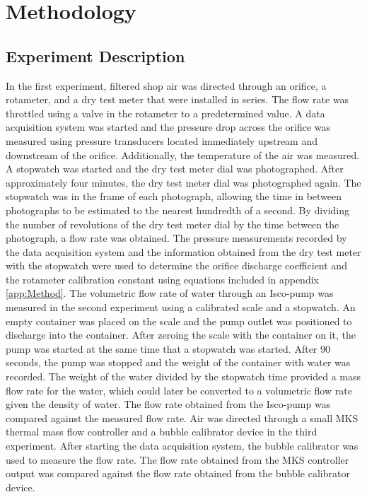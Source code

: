 \documentclass[paper=letter, fontsize=10pt]{scrartcl} %
\begin{document}
\section{Methodology}
\subsection{Experiment Description}
In the first experiment, filtered shop air was directed through an orifice, a rotameter, and a dry test meter that were installed in series.  The flow rate was throttled using a valve in the rotameter to a predetermined value.  A data acquisition system was started and the pressure drop across the orifice was measured using pressure transducers located immediately upstream and downstream of the orifice.  Additionally, the temperature of the air was measured.  A stopwatch was started and the dry test meter dial was photographed.  After approximately four minutes, the dry test meter dial was photographed again.  The stopwatch was in the frame of each photograph, allowing the time in between photographs to be estimated to the nearest hundredth of a second.  By dividing the number of revolutions of the dry test meter dial by the time between the photograph, a flow rate was obtained.  The pressure measurements recorded by the data acquisition system and the information obtained from the dry test meter with the stopwatch were used to determine the orifice discharge coefficient and the rotameter calibration constant using equations included in appendix \ref{app:Method}.
\newline
\newline
The volumetric flow rate of water through an Isco-pump was measured in the second experiment using a calibrated scale and a stopwatch.  An empty container was placed on the scale and the pump outlet was positioned to discharge into the container.  After zeroing the scale with the container on it, the pump was started at the same time that a stopwatch was started.  After 90 seconds, the pump was stopped and the weight of the container with water was recorded.  The weight of the water divided by the stopwatch time provided a mass flow rate for the water, which could later be converted to a volumetric flow rate given the density of water.  The flow rate obtained from the Isco-pump was compared against the measured flow rate.
\newline
\newline
Air was directed through a small MKS thermal mass flow controller and a bubble calibrator device in the third experiment.  After starting the data acquisition system, the bubble calibrator was used to measure the flow rate.  The flow rate obtained from the MKS controller output was compared against the flow rate obtained from the bubble calibrator device.
\end{document}
